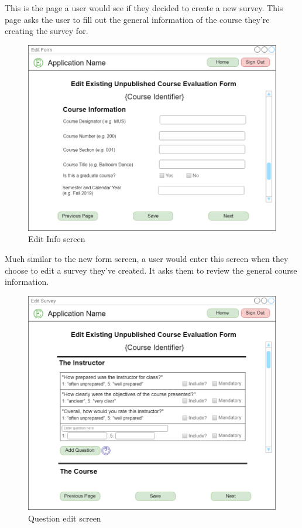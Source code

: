 \documentclass{article}
\begin{document}
This is the page a user would see if they decided to create a new survey. This page asks the user to fill out the general information of the course they're creating the survey for.

\begin{center}
\begin{figure}[H]
    \centering
    \caption{Edit Info screen}
    \includegraphics[scale=.35]{images/edit_info_screen.png}
\end{figure}
\end{center}

Much similar to the new form screen, a user would enter this screen when they choose to edit a survey they've created. It asks them to review the general course information.

\begin{center}
\begin{figure}[H]
    \centering
    \caption{Question edit screen}
    \includegraphics[scale=.35]{images/questions_screen.png}
\end{figure}
\end{center}
\end{document}
